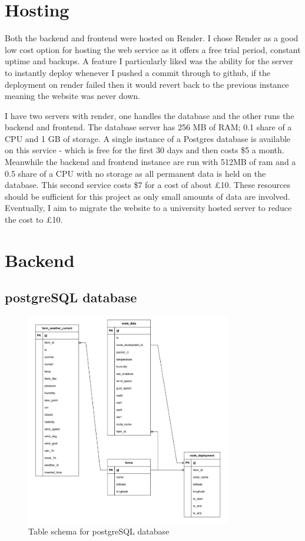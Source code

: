 \section{Hosting}

Both the backend and frontend were hosted on Render. I chose Render as a good
low cost option for hosting the web service as it offers a free trial period,
constant uptime and backups. A feature I particularly liked was the ability for
the server to instantly deploy whenever I pushed a commit through to github, if
the deployment on render failed then it would revert back to the previous
instance meaning the website was never down. 

I have two servers with render, one handles the database and the other runs the
backend and frontend. The database server has 256 MB of RAM; 0.1 share of a CPU
and 1 GB of storage. A single instance of a Postgres database is available on
this service - which is free for the first 30 days and then costs \$5 a month.
Meanwhile the backend and frontend instance are run with 512MB of ram and a 0.5
share of a CPU with no storage as all permanent data is held on the database.
This second service costs \$7 for a cost of about £10. These resources should be
sufficient for this project as only small amounts of data are involved.
Eventually, I aim to migrate the website to a university hosted server to reduce
the cost to \pounds10.

\section{Backend}

\subsection{postgreSQL database}\label{sec:database}

\begin{figure}[H]
    \centering
    \includegraphics[width=0.8\textwidth]{contents/part-3/fig3/postgres_diagram.png}
    \caption{Table schema for postgreSQL database}
    \label{fig:db_schema}
\end{figure}

